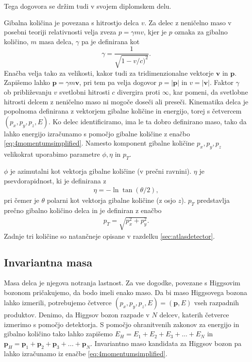 \documentclass[11pt,a4paper,openany]{book}
\begin{document}
Tega dogovora se držim tudi v svojem diplomskem delu.

Gibalna količina je povezana s hitrostjo delca $v$.  Za delec z neničelno maso v posebni teoriji relativnosti velja zveza $p = \gamma m v$, kjer je $p$ oznaka za gibalno količino, $m$ masa delca, $\gamma$ pa je definirana kot
\begin{equation}
	\gamma = \frac{1}{\sqrt{1 - v/c)^2}}.
	\label{eq:gamma}
\end{equation}
Enačba velja tako za velikosti, kakor tudi za tridimenzionalne vektorje $\mathbf{v}$ in $\mathbf{p}$. Zapišemo lahko $\mathbf{p} = \gamma m \mathbf{v}$, pri tem pa velja dogovor $p = |\mathbf{p}|$ in $v = |\mathbf{v}|$. Faktor $\gamma$ ob približevanju $v$ svetlobni hitrosti $c$ divergira proti $\infty$, kar pomeni, da svetlobne hitrosti delcem z neničelno maso ni mogoče doseči ali preseči. Kinematika delca je popolnoma definirana z vektorjem gibalne količine in energijo, torej s četvercem $(p_x, p_y, p_z, E)$. Ko delec identificiramo, ima le ta dobro definirano maso, tako da lahko energijo izračunamo s pomočjo gibalne količine z enačbo \ref{eq:4momentumsimplified}. Namesto komponent gibalne količine $p_x, p_y, p_z$ velikokrat uporabimo parametre $\phi, \eta$ in $p_T$.

$\phi$ je azimutalni kot vektorja gibalne količine (v prečni ravnini). $\eta$ je psevdorapidnost, ki je definirana z
\begin{eqnarray}
	\eta = -\ln \tan(\theta/2),
	\label{eq:pseudorapidity}
\end{eqnarray}
pri čemer je $\theta$ polarni kot vektorja gibalne količine (z osjo $z$). $p_T$ predstavlja prečno gibalno količino delca in je definiran z enačbo
\begin{eqnarray}
	p_T = \sqrt{p_x^2 + p_y^2}.
	\label{eq:transversemomentum}
\end{eqnarray}
Zadnje tri količine so natančneje opisane v razdelku \ref{sec:atlasdetector}.

\subsection{Invariantna masa}
Masa delca je njegova notranja lastnost. Za vse dogodke, povezane s Higgsovim bozonom pričakujemo, da bodo imeli enako maso. Da bi maso Higgsovega bozona lahko izmerili, potrebujemo četverce $(p_x, p_y, p_z, E) = (\mathbf{p}, E)$ vseh razpadnih produktov. Denimo, da Higgsov bozon razpade v $N$ delcev, katerih četverce izmerimo s pomočjo detektorja. S pomočjo ohranitvenih zakonov za energijo in gibalno količino tako lahko zapišemo $E_H = E_1 + E_2 + E_3 + ... + E_N$ in $\mathbf{p}_H = \mathbf{p}_1 + \mathbf{p}_2 + \mathbf{p}_3 + ... + \mathbf{p}_N$. Invariantno maso kandidata za Higgsov bozon pa lahko izračunamo iz enačbe \ref{eq:4momentumsimplified}.
\end{document}
